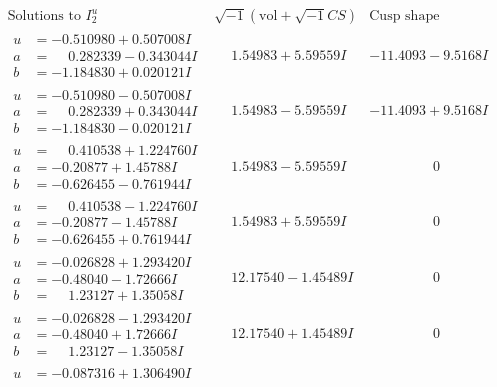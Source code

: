 \documentclass[1p]{elsarticle_modified}
\theoremstyle{definition}
\newcommand{\I}{\sqrt{-1}}
\begin{document}
$$\begin{array}{c|c|c}
\text{Solutions to }I^u_{2}& \I (\text{vol} + \sqrt{-1}CS) & \text{Cusp shape}\\
 \hline 
\begin{aligned}
u &= -0.510980 + 0.507008 I \\
a &= \phantom{-}0.282339 - 0.343044 I \\
b &= -1.184830 + 0.020121 I\end{aligned}
 & \phantom{-}1.54983 + 5.59559 I & -11.4093 - 9.5168 I \\ \hline\begin{aligned}
u &= -0.510980 - 0.507008 I \\
a &= \phantom{-}0.282339 + 0.343044 I \\
b &= -1.184830 - 0.020121 I\end{aligned}
 & \phantom{-}1.54983 - 5.59559 I & -11.4093 + 9.5168 I \\ \hline\begin{aligned}
u &= \phantom{-}0.410538 + 1.224760 I \\
a &= -0.20877 + 1.45788 I \\
b &= -0.626455 - 0.761944 I\end{aligned}
 & \phantom{-}1.54983 - 5.59559 I & \phantom{-0.000000 } 0 \\ \hline\begin{aligned}
u &= \phantom{-}0.410538 - 1.224760 I \\
a &= -0.20877 - 1.45788 I \\
b &= -0.626455 + 0.761944 I\end{aligned}
 & \phantom{-}1.54983 + 5.59559 I & \phantom{-0.000000 } 0 \\ \hline\begin{aligned}
u &= -0.026828 + 1.293420 I \\
a &= -0.48040 - 1.72666 I \\
b &= \phantom{-}1.23127 + 1.35058 I\end{aligned}
 & \phantom{-}12.17540 - 1.45489 I & \phantom{-0.000000 } 0 \\ \hline\begin{aligned}
u &= -0.026828 - 1.293420 I \\
a &= -0.48040 + 1.72666 I \\
b &= \phantom{-}1.23127 - 1.35058 I\end{aligned}
 & \phantom{-}12.17540 + 1.45489 I & \phantom{-0.000000 } 0 \\ \hline\begin{aligned}
u &= -0.087316 + 1.306490 I \\

\end{aligned}
\end{array}$$
\end{document}
